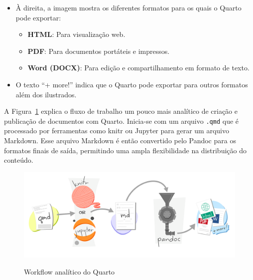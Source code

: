 \documentclass[
  a4paper,
]{article}
\providecommand{\tightlist}{%
  \setlength{\itemsep}{0pt}\setlength{\parskip}{0pt}}\usepackage{longtable,booktabs,array}
\begin{document}
\begin{tcolorbox}
\begin{enumerate}
  \begin{itemize}
  \tightlist
  \item
    À direita, a imagem mostra os diferentes formatos para os quais o
    Quarto pode exportar:

    \begin{itemize}
    \tightlist
    \item
      \textbf{HTML}: Para visualização web.
    \item
      \textbf{PDF}: Para documentos portáteis e impressos.
    \item
      \textbf{Word (DOCX)}: Para edição e compartilhamento em formato de
      texto.
    \end{itemize}
  \item
    O texto ``+ more!'' indica que o Quarto pode exportar para outros
    formatos além dos ilustrados.
  \end{itemize}
\end{enumerate}

\end{tcolorbox}

A Figura~\ref{fig-quarto-process} explica o fluxo de trabalho um pouco
mais analítico de criação e publicação de documentos com Quarto.
Inicia-se com um arquivo \texttt{.qmd} que é processado por ferramentas
como knitr ou Jupyter para gerar um arquivo Markdown. Esse arquivo
Markdown é então convertido pelo Pandoc para os formatos finais de
saída, permitindo uma ampla flexibilidade na distribuição do conteúdo.

\begin{figure}

\href{https://r-cubed-advanced.rostools.org/sessions/build-website}{\includegraphics{img/quarto-process.png}}

\caption{\label{fig-quarto-process}Workflow analítico do Quarto}

\end{figure}%
\end{document}
